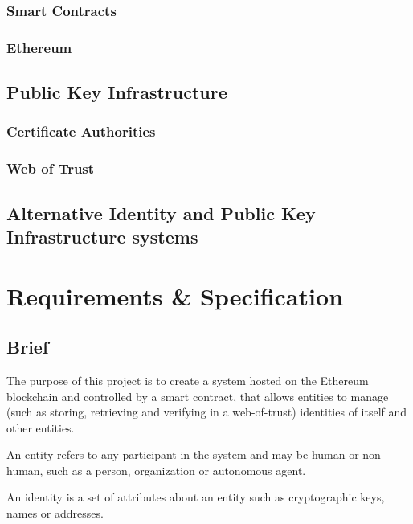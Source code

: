 \documentclass[a4paper]{report}
\begin{document}
	\subsection{Smart Contracts}
	\subsection{Ethereum}
	\section{Public Key Infrastructure}
	\subsection{Certificate Authorities}
	\subsection{Web of Trust}
	\section{Alternative Identity and Public Key Infrastructure systems}
	
	\chapter{Requirements \& Specification}
	\section{Brief}
	The purpose of this project is to create a system hosted on the Ethereum blockchain and controlled by a smart contract, that allows entities to manage (such as storing, retrieving and verifying in a web-of-trust) identities of itself and other entities.
	
	An entity refers to any participant in the system and may be human or non-human, such as a person, organization or autonomous agent.
	
	An identity is a set of attributes about an entity such as cryptographic keys, names or addresses.
	
\end{document}
